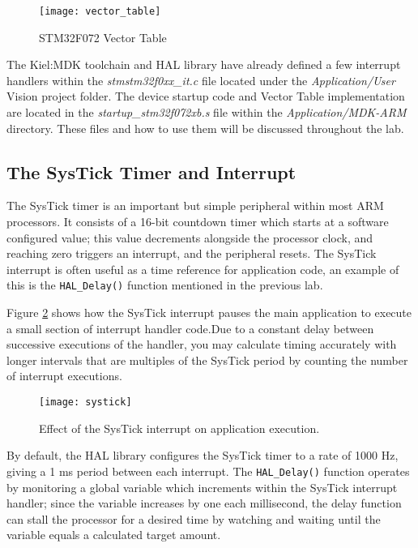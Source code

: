 \documentclass[11pt,fleqn]{book} %
\begin{document}
\begin{figure}[]
    \centering\texttt{[image: vector\_table]}
    \caption{STM32F072 Vector Table}
    \label{vector_table}
\end{figure}


The Kiel:MDK toolchain and HAL library have already defined a few interrupt handlers within the \textit{stmstm32f0xx\_it.c} file located under the \textit{Application/User} {\textmu}Vision project folder. The device startup code and Vector Table implementation are located in the \textit{startup\_stm32f072xb.s} file within the \textit{Application/MDK-ARM} directory. These files and how to use them will be discussed throughout the lab.


\subsection{The SysTick Timer and Interrupt}
The SysTick timer is an important but simple peripheral within most ARM processors. It consists of a 16-bit countdown timer which starts at a software configured value; this value decrements alongside the processor clock, and reaching zero triggers an interrupt, and the peripheral resets. The SysTick interrupt is often useful as a time reference for application code, an example of this is the \texttt{HAL\_Delay()} function mentioned in the previous lab. 

Figure \ref{systick} shows how the SysTick interrupt pauses the main application to execute a small section of interrupt handler code.Due to a constant delay between successive executions of the handler, you may calculate timing accurately with longer intervals that are multiples of the SysTick period by counting the number of interrupt executions.  

\begin{figure}[h]
    \centering\texttt{[image: systick]}
    \caption{Effect of the SysTick interrupt on application execution.}
    \label{systick}
\end{figure}

By default, the HAL library configures the SysTick timer to a rate of 1000 Hz, giving a 1 ms period between each interrupt. The \texttt{HAL\_Delay()} function operates by monitoring a global variable which increments within the SysTick interrupt handler; since the variable increases by one each millisecond, the delay function can stall the processor for a desired time by watching and waiting until the variable equals a calculated target amount. 
\end{document}
